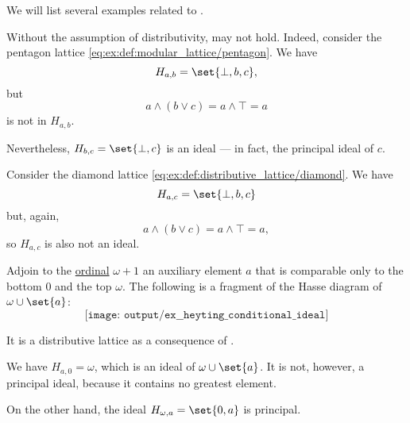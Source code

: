 \begin{example}\label{ex:heyting_conditional_ideal}
  We will list several examples related to .

  \begin{thmenum}
     Without the assumption of distributivity,  may not hold. Indeed, consider the pentagon lattice \eqref{eq:ex:def:modular_lattice/pentagon}. We have
    \begin{equation*}
      H_{a,b} = \set{ \bot, b, c },
    \end{equation*}
    but
    \begin{equation*}
      a \wedge (b \vee c) = a \wedge \top = a
    \end{equation*}
    is not in \( H_{a,b} \).

    Nevertheless, \( H_{b,c} = \set{ \bot, c } \) is an ideal --- in fact, the principal ideal of \( c \).

     Consider the diamond lattice \eqref{eq:ex:def:distributive_lattice/diamond}. We have
    \begin{equation*}
      H_{a,c} = \set{ \bot, b, c }
    \end{equation*}
    but, again,
    \begin{equation*}
      a \wedge (b \vee c) = a \wedge \top = a,
    \end{equation*}
    so \( H_{a,c} \) is also not an ideal.

     Adjoin to the \hyperref[def:ordinal]{ordinal} \( \omega + 1 \) an auxiliary element \( a \) that is comparable only to the bottom \( 0 \) and the top \( \omega \). The following is a fragment of the Hasse diagram of \( \omega \cup \set{ a } \):
    \begin{equation*}
      \texttt{[image: output/ex\_\_heyting\_conditional\_ideal]}
    \end{equation*}

    It is a distributive lattice as a consequence of .

    We have \( H_{a,0} = \omega \), which is an ideal of \( \omega \cup \set{ a } \). It is not, however, a principal ideal, because it contains no greatest element.

    On the other hand, the ideal \( H_{\omega,a} = \set{ 0, a } \) is principal.
  \end{thmenum}
\end{example}

